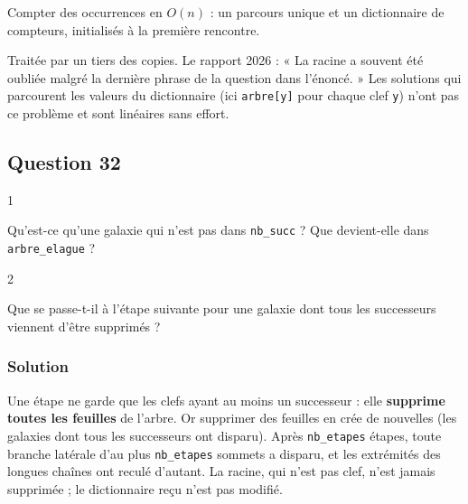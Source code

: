 \documentclass[11pt,a4paper]{article}
\begin{document}
\begin{methode}

Compter des occurrences en \(O(n)\) : un parcours unique et un dictionnaire de compteurs, initialisés à la première rencontre.

\end{methode}

\begin{jury}

Traitée par un tiers des copies. Le rapport 2026 : « La racine a souvent été oubliée malgré la dernière phrase de la question dans l'énoncé. » Les solutions qui parcourent les valeurs du dictionnaire (ici \texttt{arbre{[}y{]}} pour chaque clef \texttt{y}) n'ont pas ce problème et sont linéaires sans effort.

\end{jury}

\hypertarget{question-32}{%
\subsection{Question 32}\label{question-32}}

\begin{indication}{1}

Qu'est-ce qu'une galaxie qui n'est pas dans \texttt{nb\_succ} ? Que devient-elle dans \texttt{arbre\_elague} ?

\end{indication}

\begin{indication}{2}

Que se passe-t-il à l'étape suivante pour une galaxie dont tous les successeurs viennent d'être supprimés ?

\end{indication}

\hypertarget{solution-31}{%
\subsubsection{Solution}\label{solution-31}}

Une étape ne garde que les clefs ayant au moins un successeur : elle \textbf{supprime toutes les feuilles} de l'arbre. Or supprimer des feuilles en crée de nouvelles (les galaxies dont tous les successeurs ont disparu). Après \texttt{nb\_etapes} étapes, toute branche latérale d'au plus \texttt{nb\_etapes} sommets a disparu, et les extrémités des longues chaînes ont reculé d'autant. La racine, qui n'est pas clef, n'est jamais supprimée ; le dictionnaire reçu n'est pas modifié.
\end{document}
